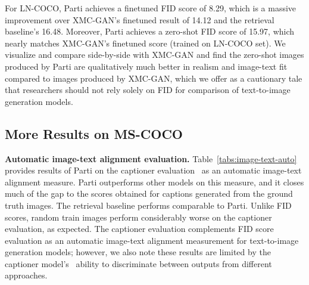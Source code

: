 For LN-COCO, Parti achieves a finetuned FID score of 8.29, which is a massive improvement over XMC-GAN's finetuned result of 14.12 and the retrieval baseline's 16.48. Moreover, Parti achieves a zero-shot FID score of 15.97, which nearly matches XMC-GAN's finetuned score (trained on LN-COCO set). We visualize and compare side-by-side with XMC-GAN and find the zero-shot images produced by Parti are qualitatively much better in realism and image-text fit compared to images produced by XMC-GAN, which we offer as a cautionary tale that researchers should not rely solely on FID for comparison of text-to-image generation models. 

\subsection{More Results on MS-COCO} \label{secs:more_results}

\textbf{Automatic image-text alignment evaluation.}
Table~\ref{tabs:image-text-auto} provides results of Parti on the captioner evaluation~\cite{Cho2022DallEval} as an automatic image-text alignment measure. Parti outperforms other models on this measure, and it closes much of the gap to the scores obtained for captions generated from the ground truth images. The retrieval baseline performs comparable to Parti. Unlike FID scores, random train images perform considerably worse on the captioner evaluation, as expected. The captioner evaluation complements FID score evaluation as an automatic image-text alignment measurement for text-to-image generation models; however, we also note these results are limited by the captioner model's~\cite{cho2021vlt5} ability to discriminate between outputs from different approaches.

\addtocounter{footnote}{1}
\addtocounter{footnote}{1}


